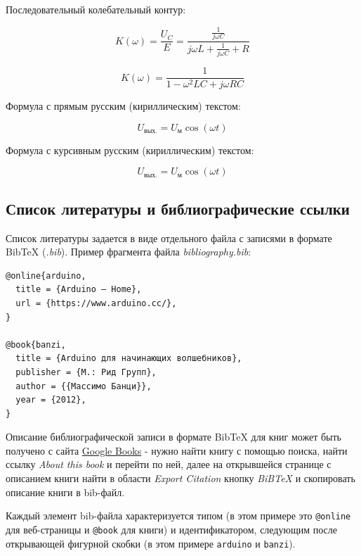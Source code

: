 \documentclass[
  a4paper,
]{book}
\theoremstyle{definition}
\theoremstyle{definition}
\theoremstyle{definition}
\theoremstyle{definition}
\theoremstyle{remark}
\begin{document}
Последовательный колебательный контур:

\begin{equation}
K(\omega)= \frac{U_{C}}{E}= \frac { \frac{1}{j\omega C}}{j \omega L+ \frac{1}{j\omega C}+R}
\end{equation}

\begin{equation}
K(\omega)=  \frac {1}{1 -\omega^2 LC+j \omega RC}
\end{equation}

Формула с прямым русским (кириллическим) текстом:

\begin{equation}
U_\text{вых.} = U_\text{м} \cos(\omega t)
\end{equation}

Формула с курсивным русским (кириллическим) текстом:

\begin{equation}
U_\textit{вых.} = U_\textit{м} \cos(\omega t)
\end{equation}

\hypertarget{markdown-syntax-bib}{%
\subsection{Список литературы и библиографические ссылки}\label{markdown-syntax-bib}}

Список литературы задается в виде отдельного файла с записями в формате BibTeX (\emph{.bib}). Пример фрагмента файла \emph{bibliography.bib}:

\begin{verbatim}
@online{arduino,
  title = {Arduino – Home},
  url = {https://www.arduino.cc/},
}

@book{banzi,
  title = {Arduino для начинающих волшебников},
  publisher = {М.: Рид Групп},
  author = {{Массимо Банци}},
  year = {2012},
}
\end{verbatim}

Описание библиографической записи в формате BibTeX для книг может быть получено с сайта \href{https://books.google.ru/}{Google Books} - нужно найти книгу с помощью поиска, найти ссылку \emph{About this book} и перейти по ней, далее на открывшейся странице с описанием книги найти в области \emph{Export Citation} кнопку \emph{BiBTeX} и скопировать описание книги в bib-файл.

Каждый элемент bib-файла характеризуется типом (в этом примере это \texttt{@online} для веб-страницы и \texttt{@book} для книги) и идентификатором, следующим после открывающей фигурной скобки (в этом примере \texttt{arduino} и \texttt{banzi}).
\end{document}
